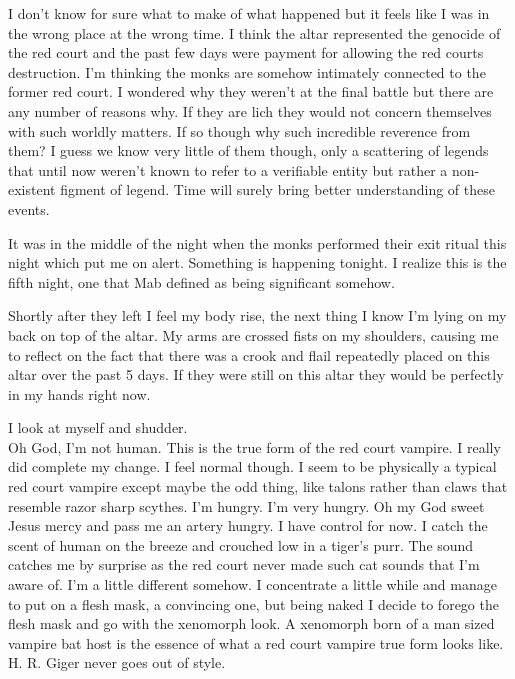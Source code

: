 I don't know for sure what to make of what happened but it feels like I was in the wrong place at the wrong time. I think the altar represented the genocide of the red court and the past few days were payment for allowing the red courts destruction. I'm thinking the monks are somehow intimately connected to the former red court. I wondered why they weren't at the final battle but there are any number of reasons why. If they are lich they would not concern themselves with such worldly matters. If so though why such incredible reverence from them? I guess we know very little of them though, only a scattering of legends that until now weren't known to refer to a verifiable entity but rather a non-existent figment of legend. Time will surely bring better understanding of these events.

It was in the middle of the night when the monks performed their exit ritual this night which put me on alert. Something is happening tonight. I realize this is the fifth night, one that Mab defined as being significant somehow.

Shortly after they left I feel my body rise, the next thing I know I'm lying on my back on top of the altar. My arms are crossed fists on my shoulders, causing me to reflect on the fact that there was a crook and flail repeatedly placed on this altar over the past 5 days. If they were still on this altar they would be perfectly in my hands right now.

\parasep

I look at myself and shudder.\\

Oh God, I'm not human. This is the true form of the red court vampire. I really did complete my change. I feel normal though. I seem to be physically a typical red court vampire except maybe the odd thing, like talons rather than claws that resemble razor sharp scythes. I'm hungry. I'm very hungry. Oh my God sweet Jesus mercy and pass me an artery hungry. I have control for now. I catch the scent of human on the breeze and crouched low in a tiger's purr. The sound catches me by surprise as the red court never made such cat sounds that I'm aware of. I'm a little different somehow. I concentrate a little while and manage to put on a flesh mask, a convincing one, but being naked I decide to forego the flesh mask and go with the xenomorph look. A xenomorph born of a man sized vampire bat host is the essence of what a red court vampire true form looks like. H. R. Giger never goes out of style. 

